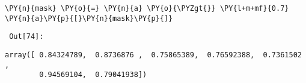 {\par%
\vspace{-1\baselineskip}%
}%
\begin{notebookcell}[74]%
\begin{addmargin}[\cellleftmargin]{0em}%
{\smaller%
\par%
%
\vspace{-1\smallerfontscale}%
\begin{Verbatim}[commandchars=\\\{\}]
\PY{n}{mask} \PY{o}{=} \PY{n}{a} \PY{o}{\PYZgt{}} \PY{l+m+mf}{0.7}
\PY{n}{a}\PY{p}{[}\PY{n}{mask}\PY{p}{]}
\end{Verbatim}
%
\par%
\vspace{-1\smallerfontscale}}%
\end{addmargin}
\end{notebookcell}

\par\vspace{1\smallerfontscale}%
    
        {\par%
        \vspace{-1\smallerfontscale}%
        \noindent%
        \begin{minipage}{\cellleftmargin}%
    \hfill%
    {\smaller%
    \tt%
    \color{nbframe-out-prompt}%
    Out[74]:}%
    \hspace{\inputpadding}%
    \hspace{0em}%
    \hspace{3pt}%
    \end{minipage}%
        }%
    \begin{addmargin}[\cellleftmargin]{0em}%
    {\smaller%
    \vspace{-1\smallerfontscale}%
    
    
    
    \begin{verbatim}
array([ 0.84324789,  0.8736876 ,  0.75865389,  0.76592388,  0.7361502 ,
        0.94569104,  0.79041938])
    \end{verbatim}

    
}%
    \end{addmargin}%

